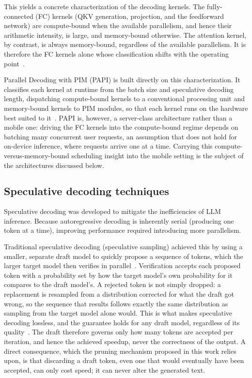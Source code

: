 \documentclass[11pt]{article}
\begin{document}
This yields a concrete characterization of the decoding kernels. The fully-connected (FC) kernels (QKV generation, projection, and the feedforward network) are compute-bound when the available parallelism, and hence their arithmetic intensity, is large, and memory-bound otherwise. The attention kernel, by contrast, is always memory-bound, regardless of the available parallelism. It is therefore the FC kernels alone whose classification shifts with the operating point~\cite{he2025papi}.

Parallel Decoding with PIM (PAPI) is built directly on this characterization. It classifies each kernel at runtime from the batch size and speculative decoding length, dispatching compute-bound kernels to a conventional processing unit and memory-bound kernels to PIM modules, so that each kernel runs on the hardware best suited to it~\cite{he2025papi}. PAPI is, however, a server-class architecture rather than a mobile one: driving the FC kernels into the compute-bound regime depends on batching many concurrent user requests, an assumption that does not hold for on-device inference, where requests arrive one at a time. Carrying this compute-versus-memory-bound scheduling insight into the mobile setting is the subject of the architectures discussed below.

\subsection{Speculative decoding techniques}\label{subsec:sd}
Speculative decoding was developed to mitigate the inefficiencies of LLM inference. Because autoregressive decoding is inherently serial (producing one token at a time), improving performance required introducing more parallelism.

Traditional speculative decoding (speculative sampling) achieved this by using a smaller, separate draft model to quickly propose a sequence of tokens, which the larger target model then verifies in parallel~\cite{leviathan2023speculative}. Verification accepts each proposed token with a probability set by how the target model's own probability for it compares to the draft model's. A rejected token is not simply dropped: a replacement is resampled from a distribution corrected for what the draft got wrong, so the sequence that results follows exactly the same distribution as sampling from the target model alone would. This is what makes speculative decoding lossless, and the guarantee holds for any draft model, regardless of its quality~\cite{leviathan2023speculative}. The draft therefore governs only how many tokens are accepted per iteration, and hence the achieved speedup, never the correctness of the output. A direct consequence, which the pruning mechanism proposed in this work relies upon, is that discarding a draft token, even one that would eventually have been accepted, can only cost speed; it can never alter the generated text.
\end{document}
